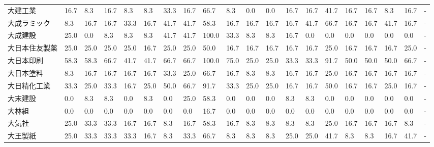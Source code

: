 \documentclass[a4paper，11pt]{jsarticle}
\begin{document}
\begin{longtable}[c]{lp{3mm}p{3mm}p{3mm}p{3mm}p{3mm}p{3mm}p{3mm}p{3mm}p{3mm}p{3mm}p{3mm}p{3mm}p{3mm}p{3mm}p{3mm}p{3mm}p{3mm}p{3mm}p{3mm}}
大建工業            &   16.7 &    8.3 &      16.7 &       8.3 &        8.3 &   33.3 &   16.7 &   66.7 &     8.3 &     0.0 &    0.0 &  16.7 &   16.7 &    41.7 &    16.7 &  16.7 &   8.3 &  16.7 &     - \\
大成ラミック          &    8.3 &   16.7 &      16.7 &      33.3 &       16.7 &   41.7 &   41.7 &   58.3 &    16.7 &    16.7 &   16.7 &  16.7 &   41.7 &    66.7 &    16.7 &  16.7 &  41.7 &  16.7 &     - \\
大成建設            &   25.0 &    0.0 &       8.3 &       8.3 &        8.3 &   41.7 &   41.7 &  100.0 &    33.3 &     8.3 &    8.3 &  16.7 &    0.0 &     0.0 &     0.0 &   0.0 &   0.0 &   0.0 &     - \\
大日本住友製薬         &   25.0 &   25.0 &      25.0 &      25.0 &       16.7 &   25.0 &   25.0 &   50.0 &    16.7 &    16.7 &   16.7 &  16.7 &   16.7 &    25.0 &    16.7 &  16.7 &  16.7 &  25.0 &     - \\
大日本印刷           &   58.3 &   58.3 &      66.7 &      41.7 &       41.7 &   66.7 &   66.7 &  100.0 &    75.0 &    25.0 &   25.0 &  33.3 &   33.3 &    91.7 &    50.0 &  50.0 &  50.0 &  66.7 &     - \\
大日本塗料           &    8.3 &   16.7 &      16.7 &      16.7 &       16.7 &   33.3 &   25.0 &   66.7 &    16.7 &     8.3 &    8.3 &  16.7 &   16.7 &    25.0 &    16.7 &  16.7 &  16.7 &  16.7 &     - \\
大日精化工業          &   33.3 &   25.0 &      33.3 &      16.7 &       25.0 &   50.0 &   66.7 &   91.7 &    33.3 &    25.0 &   25.0 &  16.7 &   16.7 &    50.0 &    16.7 &  16.7 &  25.0 &  16.7 &     - \\
大末建設            &    0.0 &    8.3 &       8.3 &       0.0 &        8.3 &    0.0 &   25.0 &   58.3 &     0.0 &     0.0 &    0.0 &   8.3 &    8.3 &     0.0 &     0.0 &   0.0 &   0.0 &   0.0 &     - \\
大林組             &    0.0 &    0.0 &       0.0 &       0.0 &        0.0 &    0.0 &    0.0 &   16.7 &     0.0 &     0.0 &    0.0 &   0.0 &    0.0 &     0.0 &     0.0 &   0.0 &   0.0 &   0.0 &     - \\
大気社             &   25.0 &   33.3 &      33.3 &      16.7 &       16.7 &    8.3 &   16.7 &   58.3 &    16.7 &     8.3 &    8.3 &   8.3 &    8.3 &    25.0 &    16.7 &  16.7 &  16.7 &   8.3 &     - \\
大王製紙            &   25.0 &   33.3 &      33.3 &      33.3 &       16.7 &    8.3 &   33.3 &   66.7 &     8.3 &     8.3 &    8.3 &  25.0 &   25.0 &    41.7 &     8.3 &   8.3 &  16.7 &  41.7 &     - \\

\end{longtable}
\end{document}

